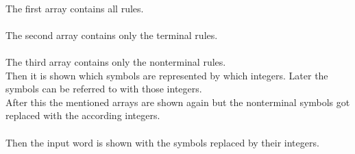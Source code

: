 \documentclass[a4paper, 11pt]{article}
\begin{document}
\begin{minipage}{0.6\textwidth}
\vspace*{-2em}
\ \\
The first array contains all rules. \\ \\

The second array contains only the terminal rules. \\ \\

The third array contains only the nonterminal rules. \\

Then it is shown which symbols are represented by which integers. Later the symbols can be referred to with those integers. \\ 

After this the mentioned arrays are shown again but the nonterminal symbols got replaced with the according integers. \\ \\

Then the input word is shown with the symbols replaced by their integers.


\end{minipage}
\end{document}
